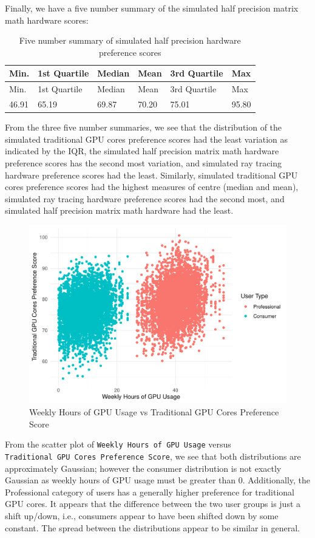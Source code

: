 \documentclass[
]{article}
\begin{document}
Finally, we have a five number summary of the simulated half precision
matrix math hardware scores:

\begin{longtable}[]{@{}llllll@{}}
\caption{Five number summary of simulated half precision hardware
preference scores}\tabularnewline
\toprule()
Min. & 1st Quartile & Median & Mean & 3rd Quartile & Max \\
\midrule()
\endfirsthead
\toprule()
Min. & 1st Quartile & Median & Mean & 3rd Quartile & Max \\
\midrule()
\endhead
46.91 & 65.19 & 69.87 & 70.20 & 75.01 & 95.80 \\
\bottomrule()
\end{longtable}

From the three five number summaries, we see that the distribution of
the simulated traditional GPU cores preference scores had the least
variation as indicated by the IQR, the simulated half precision matrix
math hardware preference scores has the second most variation, and
simulated ray tracing hardware preference scores had the least.
Similarly, simulated traditional GPU cores preference scores had the
highest measures of centre (median and mean), simulated ray tracing
hardware preference scores had the second most, and simulated half
precision matrix math hardware had the least.

\begin{figure}

{\centering \includegraphics[width=0.6\linewidth,]{Assignment1_files/figure-latex/unnamed-chunk-6-1} 

}

\caption{Weekly Hours of GPU Usage vs Traditional GPU Cores Preference Score}\label{fig:unnamed-chunk-6}
\end{figure}

From the scatter plot of \texttt{Weekly\ Hours\ of\ GPU\ Usage} versus
\texttt{Traditional\ GPU\ Cores\ Preference\ Score}, we see that both
distributions are approximately Gaussian; however the consumer
distribution is not exactly Gaussian as weekly hours of GPU usage must
be greater than 0. Additionally, the Professional category of users has
a generally higher preference for traditional GPU cores. It appears that
the difference between the two user groups is just a shift up/down,
i.e., consumers appear to have been shifted down by some constant. The
spread between the distributions appear to be similar in general.
\end{document}
